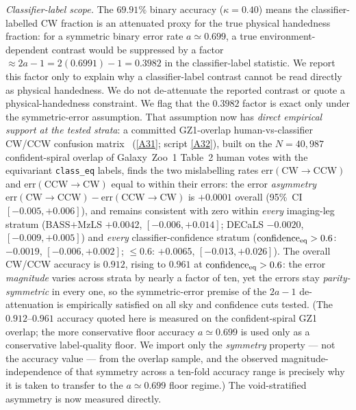 \documentclass[aps,prd,twocolumn,superscriptaddress,showpacs,preprintnumbers,nofootinbib,longbibliography,floatfix]{revtex4-2}
\newcommand{\repoBase}{https://github.com/Hubify-Projects/bigbounce/blob/main}
\begin{document}
\emph{Classifier-label scope.} The $69.91\%$ binary accuracy
($\kappa=0.40$) means the
classifier-labelled CW fraction is an attenuated proxy for the true
physical handedness fraction: for a symmetric binary error rate
$a\simeq0.699$, a true environment-dependent contrast would be
suppressed by a factor $\approx 2a-1 = 2(0.6991)-1 = 0.3982$ in the
classifier-label statistic. We report this factor only to explain why a
classifier-label contrast cannot be read directly as physical
handedness. We do not de-attenuate the reported contrast or quote a
physical-handedness constraint.
We flag that the $0.3982$ factor is exact only under the
symmetric-error assumption. That assumption now has \emph{direct empirical
support at the tested strata}: a committed GZ1-overlap human-vs-classifier
CW/CCW confusion matrix~\cite{golden_chirality_2026}
(\href{\repoBase/pipelines/p2\_chirality/outputs/gz1\_stratified\_confusion.json}{[A31]};
script \href{\repoBase/pipelines/p2\_chirality/scripts/gz1\_stratified\_confusion.py}{[A32]}),
built on the
$N=40{,}987$ confident-spiral overlap of Galaxy~Zoo~1 Table~2 human votes with
the equivariant \texttt{class\_eq} labels, finds the two mislabelling rates
$\mathrm{err}(\mathrm{CW}\!\to\!\mathrm{CCW})$ and
$\mathrm{err}(\mathrm{CCW}\!\to\!\mathrm{CW})$ equal to within their errors:
the error \emph{asymmetry}
$\mathrm{err}(\mathrm{CW}\!\to\!\mathrm{CCW})-\mathrm{err}(\mathrm{CCW}\!\to\!\mathrm{CW})$
is $+0.0001$ overall (95\%~CI $[-0.005,+0.006]$), and remains consistent with
zero within \emph{every} imaging-leg stratum (BASS$+$MzLS $+0.0042$,
$[-0.006,+0.014]$; DECaLS $-0.0020$, $[-0.009,+0.005]$) and \emph{every}
classifier-confidence stratum ($\mathrm{confidence}_{\rm eq}>0.6$: $-0.0019$,
$[-0.006,+0.002]$; $\le0.6$: $+0.0065$, $[-0.013,+0.026]$). The overall
CW/CCW accuracy is $0.912$, rising to $0.961$ at
$\mathrm{confidence}_{\rm eq}>0.6$: the error \emph{magnitude} varies across
strata by nearly a factor of ten, yet the errors stay
\emph{parity-symmetric} in every one, so the symmetric-error premise of the
$2a-1$ de-attenuation is empirically satisfied on all sky and confidence cuts
tested. (The $0.912$--$0.961$ accuracy quoted here is measured on the
confident-spiral GZ1 overlap; the more conservative floor accuracy
$a\!\simeq\!0.699$ is used only as a conservative label-quality floor.
We import only the
\emph{symmetry} property --- not the accuracy value --- from the overlap
sample, and the observed magnitude-independence of that symmetry across a
ten-fold accuracy range is precisely why it is taken to transfer to the
$a\!\simeq\!0.699$ floor regime.) The void-stratified asymmetry is now measured directly.
\end{document}
